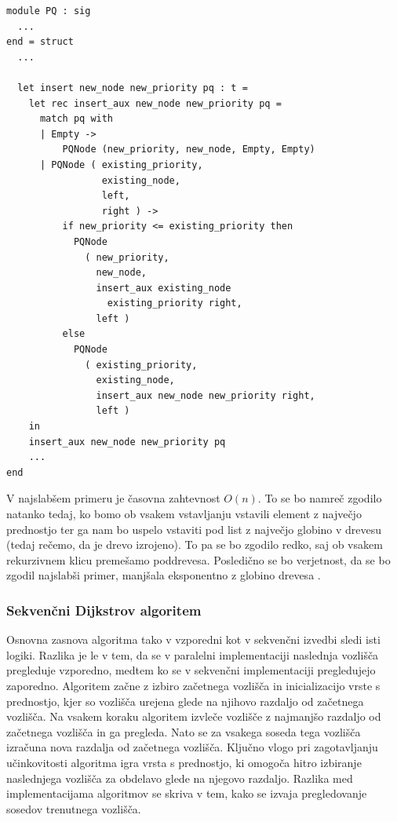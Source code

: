 \documentclass[fin1, tisk]{fmfdelo}
\begin{document}
\begin{lstlisting}[label=lst:pq_insert]
module PQ : sig
  ...
end = struct
  ...

  let insert new_node new_priority pq : t =
    let rec insert_aux new_node new_priority pq =
      match pq with
      | Empty -> 
          PQNode (new_priority, new_node, Empty, Empty)
      | PQNode ( existing_priority, 
                 existing_node, 
                 left, 
                 right ) ->
          if new_priority <= existing_priority then
            PQNode
              ( new_priority,
                new_node,
                insert_aux existing_node 
                  existing_priority right,
                left )
          else
            PQNode
              ( existing_priority,
                existing_node,
                insert_aux new_node new_priority right,
                left )
    in
    insert_aux new_node new_priority pq
    ...
end
\end{lstlisting}

V najslabšem primeru je časovna zahtevnost $O(n)$. To se bo namreč zgodilo natanko tedaj, ko bomo ob vsakem vstavljanju
vstavili element z največjo prednostjo ter ga nam bo uspelo vstaviti pod list z največjo globino v drevesu (tedaj
rečemo, da je drevo izrojeno). To pa se bo zgodilo redko, saj ob vsakem rekurzivnem klicu premešamo poddrevesa.
Posledično se bo verjetnost, da se bo zgodil najslabši primer, manjšala eksponentno z globino drevesa \cite{okasaki1996}.

\subsubsection{Sekvenčni Dijkstrov algoritem}

Osnovna zasnova algoritma tako v vzporedni kot v sekvenčni izvedbi sledi isti logiki. Razlika je le v tem, da se v paralelni
implementaciji naslednja vozlišča pregleduje vzporedno, medtem ko se v sekvenčni implementaciji pregledujejo zaporedno.
Algoritem začne z izbiro začetnega vozlišča in inicializacijo vrste s prednostjo,
kjer so vozlišča urejena glede na njihovo razdaljo od začetnega vozlišča. Na vsakem koraku algoritem izvleče vozlišče z najmanjšo
razdaljo od začetnega vozlišča in ga pregleda. Nato se za vsakega soseda tega vozlišča izračuna nova razdalja od začetnega
vozlišča. Ključno vlogo pri zagotavljanju učinkovitosti algoritma igra vrsta s prednostjo, ki omogoča hitro izbiranje
naslednjega vozlišča za obdelavo glede na njegovo razdaljo. Razlika med implementacijama algoritmov se skriva v tem,
kako se izvaja pregledovanje sosedov trenutnega vozlišča.
\end{document}
